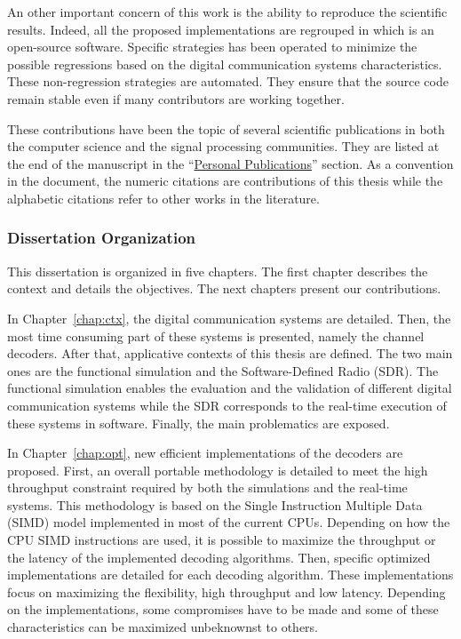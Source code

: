 An other important concern of this work is the ability to reproduce the
scientific results. Indeed, all the proposed implementations are regrouped in
\AFFECT which is an open-source software. Specific strategies has been operated
to minimize the possible regressions based on the digital communication systems
characteristics. These non-regression strategies are automated. They ensure that
the source code remain stable even if many contributors are working together.

These contributions have been the topic of several scientific publications in
both the computer science and the signal processing communities. They are listed
at the end of the manuscript in the
``\hyperref[chap:publi]{Personal Publications}'' section. As a convention in the
document, the numeric citations are contributions of this thesis while the
alphabetic citations refer to other works in the literature.

\subsubsection*{Dissertation Organization}

This dissertation is organized in five chapters. The first chapter describes the
context and details the objectives. The next chapters present our contributions.

In Chapter~\ref{chap:ctx}, the digital communication systems are detailed. Then,
the most time consuming part of these systems is presented, namely the channel
decoders. After that, applicative contexts of this thesis are defined. The two
main ones are the functional simulation and the Software-Defined Radio (SDR).
The functional simulation enables the evaluation and the validation of different
digital communication systems while the SDR corresponds to the real-time
execution of these systems in software. Finally, the main problematics are
exposed.

In Chapter~\ref{chap:opt}, new efficient implementations of the decoders are
proposed. First, an overall portable methodology is detailed to meet the high
throughput constraint required by both the simulations and the real-time
systems. This methodology is based on the Single Instruction Multiple Data
(SIMD) model implemented in most of the current CPUs. Depending on how the CPU
SIMD instructions are used, it is possible to maximize the throughput or the
latency of the implemented decoding algorithms. Then, specific optimized
implementations are detailed for each decoding algorithm. These implementations
focus on maximizing the flexibility, high throughput and low latency. Depending
on the implementations, some compromises have to be made and some of these
characteristics can be maximized unbeknownst to others.

